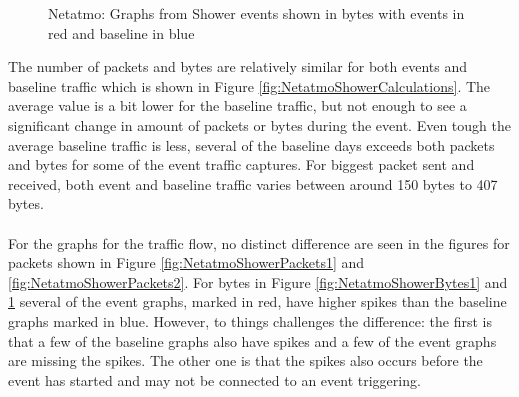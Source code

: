 \begin{figure}[H]
\begin{subfigure}[b]{0.47\textwidth}
    \end{subfigure}
        \begin{subfigure}[b]{0.47\textwidth}
        \centering
    \end{subfigure}
    \begin{subfigure}[b]{0.47\textwidth}
        \centering
    \end{subfigure}
    \begin{subfigure}[b]{0.47\textwidth}
        \centering
    \end{subfigure}
    \hspace{0.6cm}
    \begin{subfigure}[b]{0.47\textwidth}
    \centering
        \end{subfigure}
    \caption{Netatmo: Graphs from Shower events shown in bytes with events in red and baseline in blue}
    \label{fig:NetatmoShowerBytes2}
\end{figure}

The number of packets and bytes are relatively similar for both events and baseline traffic which is shown in Figure \ref{fig:NetatmoShowerCalculations}. The average value is a bit lower for the baseline traffic, but not enough to see a significant change in amount of packets or bytes during the event. Even tough the average baseline traffic is less, several of the baseline days exceeds both packets and bytes for some of the event traffic captures. For biggest packet sent and received, both event and baseline traffic varies between around 150 bytes to 407 bytes. 
\\\\
For the graphs for the traffic flow, no distinct difference are seen in the figures for packets shown in Figure \ref{fig:NetatmoShowerPackets1} and \ref{fig:NetatmoShowerPackets2}. For bytes in Figure \ref{fig:NetatmoShowerBytes1} and \ref{fig:NetatmoShowerBytes2} several of the event graphs, marked in red, have higher spikes than the baseline graphs marked in blue. However, to things challenges the difference: the first is that a few of the baseline graphs also have spikes and a few of the event graphs are missing the spikes. The other one is that the spikes also occurs before the event has started and may not be connected to an event triggering. 

